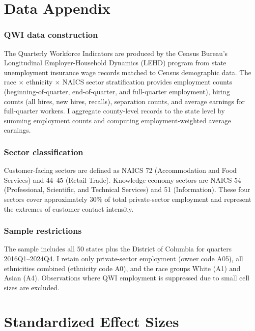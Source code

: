 \documentclass[12pt]{article}
\begin{document}
\label{apep_main_text_end}
\newpage


\newpage
\appendix

\section{Data Appendix}

\subsubsection*{QWI data construction} The Quarterly Workforce Indicators are produced by the Census Bureau's Longitudinal Employer-Household Dynamics (LEHD) program from state unemployment insurance wage records matched to Census demographic data. The race $\times$ ethnicity $\times$ NAICS sector stratification provides employment counts (beginning-of-quarter, end-of-quarter, and full-quarter employment), hiring counts (all hires, new hires, recalls), separation counts, and average earnings for full-quarter workers. I aggregate county-level records to the state level by summing employment counts and computing employment-weighted average earnings.

\subsubsection*{Sector classification} Customer-facing sectors are defined as NAICS 72 (Accommodation and Food Services) and 44--45 (Retail Trade). Knowledge-economy sectors are NAICS 54 (Professional, Scientific, and Technical Services) and 51 (Information). These four sectors cover approximately 30\% of total private-sector employment and represent the extremes of customer contact intensity.

\subsubsection*{Sample restrictions} The sample includes all 50 states plus the District of Columbia for quarters 2016Q1--2024Q4. I retain only private-sector employment (owner code A05), all ethnicities combined (ethnicity code A0), and the race groups White (A1) and Asian (A4). Observations where QWI employment is suppressed due to small cell sizes are excluded.

\section{Standardized Effect Sizes}
\label{sec:sde}


\end{document}
